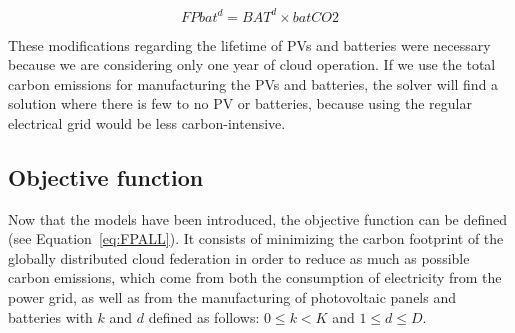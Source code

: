 \begin{equation} \label{eq:fbat}
   FPbat^d =  BAT^d \times batCO2
\end{equation}


These modifications regarding the lifetime of PVs and batteries were necessary because we are considering only one year of cloud operation. If we use the total carbon emissions for manufacturing the PVs and batteries, the solver will find a solution where there is few to no PV or batteries, because using the regular electrical grid would be less carbon-intensive.  

\subsection{Objective function}
\label{sec:objectivefunction_ccgrid}

Now that the models have been introduced, the objective function can be defined (see Equation~\eqref{eq:FPALL}). It consists of minimizing the carbon footprint of the globally distributed cloud federation in order to reduce as much as possible carbon emissions, which come from both the consumption of electricity from the power grid, as well as from the manufacturing of photovoltaic panels and batteries with $k$ and $d$ defined as follows: $0\leq k< K$ and $1\leq d\leq D$.

